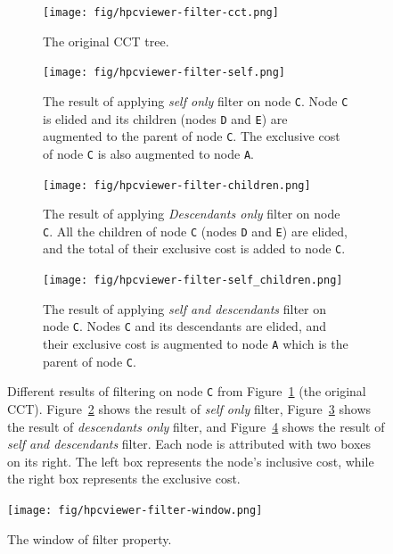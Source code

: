 \begin{figure}
  \centering
  \begin{subfigure}{.45\textwidth}
    \centering
    \texttt{[image: fig/hpcviewer-filter-cct.png]}
    \caption{The original CCT tree.}
    \label{fig:filter-cct}
  \end{subfigure}%
  \qquad
  \begin{subfigure}{.45\textwidth}
    \centering
    \texttt{[image: fig/hpcviewer-filter-self.png]}
    \caption{The result of applying \emph{self only} filter on node \texttt{C}. %
Node \texttt{C} is elided and its children (nodes \texttt{D} and \texttt{E}) are augmented to the parent of node \texttt{C}. 
The exclusive cost of node \texttt{C} is also augmented to node \texttt{A}.}
    \label{fig:filter-self}
  \end{subfigure}
  \begin{subfigure}{.45\textwidth}
    \centering
    \texttt{[image: fig/hpcviewer-filter-children.png]}
    \caption{The result of applying \emph{Descendants only} filter on node \texttt{C}. %
All the children of node \texttt{C} (nodes \texttt{D} and \texttt{E}) are elided, and the total of their exclusive cost is added to node \texttt{C}. }
    \label{fig:filter-children}
  \end{subfigure}%
  \qquad
  \begin{subfigure}{.45\textwidth}
    \centering
    \texttt{[image: fig/hpcviewer-filter-self\_children.png]}
    \caption{The result of applying \emph{self and descendants} filter on node \texttt{C}. %
Nodes \texttt{C} and its descendants are elided, and their exclusive cost is augmented to node \texttt{A} which is the parent of node \texttt{C}.}
    \label{fig:filter-selfchildren}
  \end{subfigure}

  \caption{Different results of filtering on node \texttt{C} from Figure~\ref{fig:filter-cct} (the original CCT). Figure~\ref{fig:filter-self} shows the result of \emph{self only} filter,
	   Figure~\ref{fig:filter-children} shows the result of \emph{descendants only} filter, and Figure~\ref{fig:filter-selfchildren} shows the result of \emph{self and descendants} filter.
 Each node is attributed with two boxes on its right.  The left box represents the node's inclusive cost, while the right box represents the exclusive cost.}
  \label{fig:filter}
\end{figure}
\begin{figure}
 \centering
 \texttt{[image: fig/hpcviewer-filter-window.png]}
 \caption{The window of filter property.}
 \label{fig:filter-window}
\end{figure}

